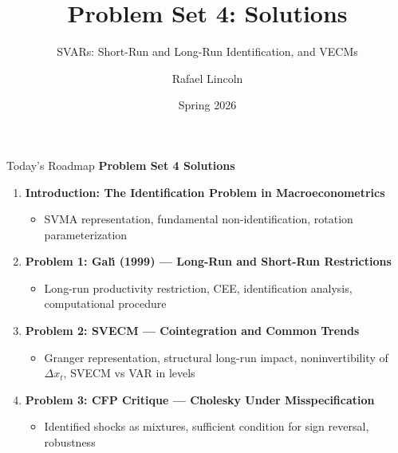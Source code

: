 \documentclass[aspectratio=169,11pt]{beamer}
\title{Problem Set 4: Solutions}
\subtitle{SVARs: Short-Run and Long-Run Identification, and VECMs}
\author{Rafael Lincoln}
\institute{Econometrics II -- NYU PhD Program}
\date{Spring 2026}
\begin{document}
\begin{frame}[plain]
    \titlepage
\end{frame}

\begin{frame}{Today's Roadmap}
    \textbf{Problem Set 4 Solutions}
    \begin{enumerate}
        \item \textbf{Introduction: The Identification Problem in Macroeconometrics}
        \begin{itemize}
            \item SVMA representation, fundamental non-identification, rotation parameterization
        \end{itemize}
        \vspace{0.3em}
        \item \textbf{Problem 1: Gal\'{\i} (1999) --- Long-Run and Short-Run Restrictions}
        \begin{itemize}
            \item Long-run productivity restriction, CEE, identification analysis, computational procedure
        \end{itemize}
        \vspace{0.3em}
        \item \textbf{Problem 2: SVECM --- Cointegration and Common Trends}
        \begin{itemize}
            \item Granger representation, structural long-run impact, noninvertibility of $\Delta x_t$, SVECM vs VAR in levels
        \end{itemize}
        \vspace{0.3em}
        \item \textbf{Problem 3: CFP Critique --- Cholesky Under Misspecification}
        \begin{itemize}
            \item Identified shocks as mixtures, sufficient condition for sign reversal, robustness
        \end{itemize}
    \end{enumerate}
\end{frame}
\end{document}
